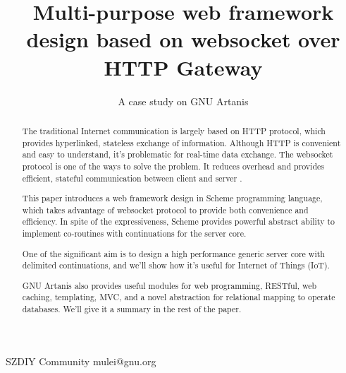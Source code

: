 \documentclass[numbers,numberedpars]{sigplanconf}
\begin{document}
\setlength{\pdfpageheight}{\paperheight}
\setlength{\pdfpagewidth}{\paperwidth}




\title{Multi-purpose web framework design based on websocket over HTTP Gateway}
\subtitle{A case study on GNU Artanis}

           {SZDIY Community}
           {mulei@gnu.org}

\maketitle

\begin{abstract}
  The traditional Internet communication is largely based on HTTP protocol, which provides hyperlinked, stateless exchange of information.
  Although HTTP is convenient and easy to understand, it's problematic for real-time data exchange. The websocket protocol is one of the ways
  to solve the problem. It reduces overhead and provides efficient, stateful communication between client and server \citep{6197172}.
  
  This paper introduces a web framework design in Scheme programming language, which takes advantage of websocket protocol to provide both
  convenience and efficiency. In spite of the expressiveness, Scheme provides powerful abstract ability to implement co-routines with
  continuations for the server core.

  One of the significant aim is to design a high performance generic server core with delimited continuations, and we'll show how it's useful
  for Internet of Things (IoT).
  
  GNU Artanis also provides useful modules for web programming, RESTful, web caching, templating, MVC, and a novel abstraction for relational
  mapping to operate databases. We'll give it a summary in the rest of the paper.
\end{abstract}
\end{document}
